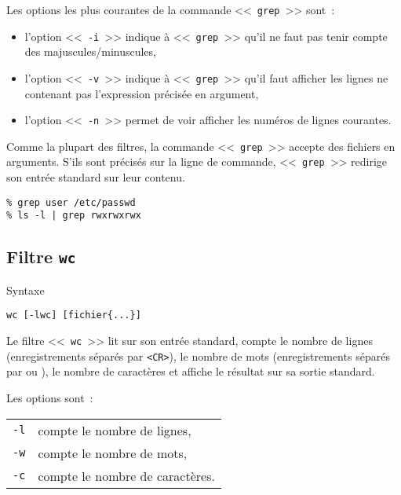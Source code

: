 Les options les plus courantes de la commande <<~{\tt grep}~>> sont~:
\begin{itemize}
	\item l'option <<~{\tt -i}~>> indique {\`a} <<~{\tt grep}~>> qu'il ne faut pas
		  tenir compte des majuscules/minuscules,
	\item l'option <<~{\tt -v}~>> indique {\`a} <<~{\tt grep}~>> qu'il faut afficher
		  les lignes ne contenant pas l'expression pr{\'e}cis{\'e}e en argument,
	\item l'option <<~{\tt -n}~>> permet de voir afficher les num{\'e}ros de
		  lignes courantes.
\end{itemize}

Comme la plupart des filtres, la commande <<~{\tt grep}~>> accepte des
fichiers en arguments. S'ils sont pr{\'e}cis{\'e}s sur la ligne de commande,
<<~{\tt grep}~>> redirige son entr{\'e}e standard sur leur contenu.

\begin{example}
\begin{verbatim}
% grep user /etc/passwd
% ls -l | grep rwxrwxrwx
\end{verbatim}
\end{example}

\subsection{Filtre {\tt wc}}

\begin{definition}{Syntaxe}
\begin{verbatim}
wc [-lwc] [fichier{...}]
\end{verbatim}
\end{definition}

Le filtre <<~{\tt wc}~>> lit sur son entr{\'e}e standard,  compte le nombre
de lignes (enregistrements s{\'e}par{\'e}s par \verb=<CR>=), le nombre de mots
(enregistrements s{\'e}par{\'e}s par \spacekey ou \tabkey), le nombre de
caract{\`e}res et affiche le r{\'e}sultat sur sa sortie standard.

Les options sont~:\\
\begin{tabular}{l@{\hspace{0.5cm}}l}
	{\tt -l}	&	compte le nombre de lignes,\\
	{\tt -w}	&	compte le nombre de mots,\\
	{\tt -c}	&	compte le nombre de caract{\`e}res.
\end{tabular}

